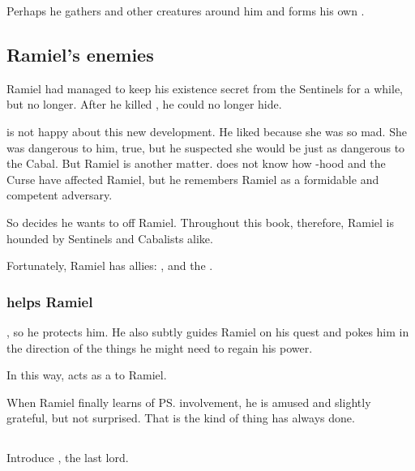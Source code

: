 \begin{garbage}
Perhaps he gathers \vorcanths{} and other creatures around him and forms his own \Rinjuuken. 









\subsection{Ramiel's enemies}
Ramiel had managed to keep his existence secret from the Sentinels for a while, but no longer. 
After he killed \Shiaraid, he could no longer hide. 

\Secherdamon{} is not happy about this new development. 
He liked \Shiaraid{} because she was so mad. 
She was dangerous to him, true, but he suspected she would be just as dangerous to the Cabal. 
But Ramiel is another matter. 
\Secherdamon{} does not know how \malach-hood and the Curse have affected Ramiel, but he remembers Ramiel as a formidable and competent adversary. 

So \Secherdamon{} decides he wants to off Ramiel. 
Throughout this book, therefore, Ramiel is hounded by Sentinels and Cabalists alike. 

Fortunately, Ramiel has allies: 
\Cishiel, \Azraid{} and the \vorcanths. 





\subsubsection{\Azraid{} helps Ramiel}
\Azraid{} , so he protects him. 
He also subtly guides Ramiel on his quest and pokes him in the direction of the things he might need to regain his power. 

In this way, \Azraid{} acts as a  to Ramiel. 

When Ramiel finally learns of \ps{\Azraid} involvement, he is amused and slightly grateful, but not surprised. 
That is the kind of thing \Azraid{} has always done. 








\subsection{\Sithiyacaan}
Introduce \hs{\Sithiyacaan}, the last \hs{\Kezeradi} lord. 








\end{garbage}
